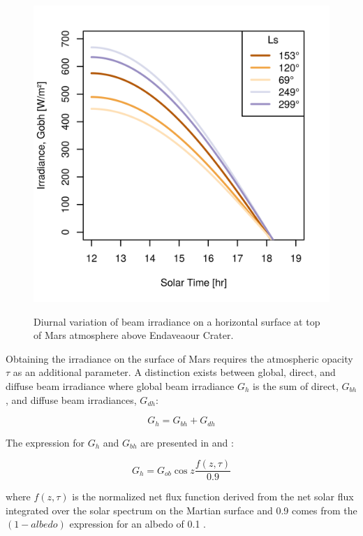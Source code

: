 \begin{figure}[h]
  \centering
  \hypersetup{linkcolor=captionTextColor}
  \includegraphics[width=0.5\linewidth]{sections/mars-solar-energy/solar-radiation/plots/gobh-diurnal-over-endaveaour-crater.png}\\
  \caption[Diurnal variation of beam irradiance on a horizontal surface at top of Mars atmosphere above Endaveaour Crater]
  {Diurnal variation of beam irradiance on a horizontal surface at top of Mars atmosphere above Endaveaour Crater.}
  \label{fig:plot:diurnal-variation-of-beam-irradiance-on-a-horizontal-surface-at-top-of-mars-atmosphere}
\end{figure}

Obtaining the irradiance on the surface of Mars requires the atmospheric opacity $\tau$ as an additional parameter. A distinction exists between global, direct, and diffuse beam irradiance where global beam irradiance $G_{h}$ is the sum of direct, $G_{bh}$, and diffuse beam irradiances, $G_{dh}$:



\begin{equation}
  \label{eq:G_h_1}
  G_{h} = G_{bh} + G_{dh}
\end{equation}

The expression for $G_{h}$ and $G_{bh}$ are presented in  and :

\begin{equation}
  \label{eq:G_h_2}
  G_{h} = G_{ob}\cos{z}\frac{f(z,\tau)}{0.9}
\end{equation}

where $f(z,\tau)$ is the normalized net flux function derived from the net solar flux integrated over the solar spectrum on the Martian surface and 0.9 comes from the $(1-albedo)$ expression for an albedo of 0.1 .

